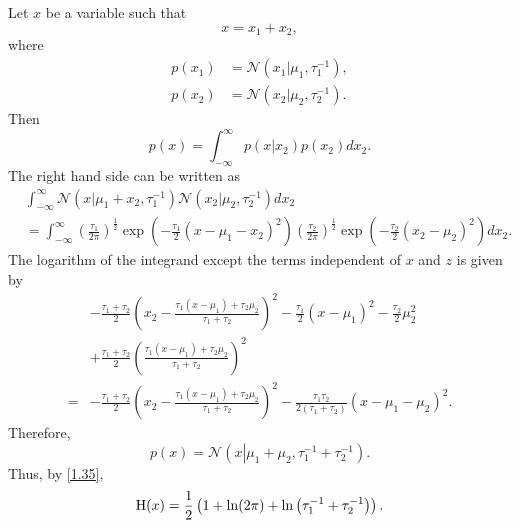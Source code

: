 \subsection{}
\label{2.16}
Let $x$ be a variable such that
\begin{equation}
x 
= 
x_1 
+ 
x_2,
\end{equation}
%
where
%
\begin{equation}
\begin{aligned}
p(x_1) 
&= 
\mathcal{N} 
\left(
	x_1 
	| 
	\mu_1, 
	\tau_1 ^ {- 1} 
\right), 
\\
p(x_2) 
&= 
\mathcal{N} 
\left(
	x_2
	| 
	\mu_2, 
	\tau_2 ^ {- 1} 
\right).
\end{aligned} 
\end{equation}
%
Then
%
\begin{equation}
p(x) 
= 
\int_{- \infty}^{\infty} 
p(x | x_2) 
p(x_2) 
dx_2.
\end{equation}
%
The right hand side can be written as
%
\begin{equation}
\begin{aligned}
&
\int_{- \infty}^{\infty} 
\mathcal{N} 
\left(
	x 
	| 
	\mu_1 
	+ 
	x_2, 
	\tau_1 ^ {-1}
\right) 
\mathcal{N} 
\left(
	x_2 
	| 
	\mu_2, 
	\tau_2 ^ {- 1} 
\right) 
dx_2 
\\
&= 
\int_{- \infty}^{\infty} 
\left( 
	\frac{\tau_1}{2 \pi} 
\right) ^ \frac{1}{2} 
\exp 
\left( 
	- 
	\frac{\tau_1}{2} 
	(x - \mu_1 - x_2) ^ 2 
\right) 
\left( 
	\frac{\tau_2}{2 \pi} 
\right) ^ \frac{1}{2} 
\exp 
\left( 
	- 
	\frac{\tau_2}{2} 
	(x_2 - \mu_2) ^ 2 
\right) 
dx_2.
\end{aligned}
\end{equation}
%
The logarithm of the integrand except the terms independent of $x$ and $z$ is given by
%
\begin{equation}
\begin{aligned}
& 
- 
\frac{\tau_1 + \tau_2}{2} 
\left( 
	x_2 
	- 
	\frac{\tau_1 (x - \mu_1) + \tau_2 \mu_2}{\tau_1 + \tau_2} 
\right) ^ 2
- 
\frac{\tau_1}{2} 
(x - \mu_1) ^ 2 
- 
\frac{\tau_2}{2} 
\mu_2 ^ 2 
\\
&+ 
\frac{\tau_1 + \tau_2}{2} 
\left( 
	\frac{\tau_1 (x - \mu_1) + \tau_2 \mu_2}{\tau_1 + \tau_2} 
\right) ^ 2
\\
=&
- 
\frac{\tau_1 + \tau_2}{2} 
\left( 
	x_2 
	- 
	\frac{\tau_1 (x - \mu_1) + \tau_2 \mu_2}{\tau_1 + \tau_2} 
\right) ^ 2
- 
\frac{\tau_1 \tau_2}{2 (\tau_1 + \tau_2)} 
( x - \mu_1 - \mu_2 ) ^ 2.
\end{aligned}
\end{equation}
%
Therefore,
%
\begin{equation}
p(x) 
= 
\mathcal{N} 
\left( 
	x 
	\left.
	\right \vert
	\mu_1 + \mu_2, 
	\tau_1 ^ {- 1} 
	+ 
	\tau_2 ^ {-1} 
\right).
\end{equation}
%
Thus, by \ref{1.35},
%
\begin{equation}
{\rm H}(x) 
= 
\frac{1}{2} 
\left( 
	1 
	+ 
	\ln (2 \pi)
	+ 
	\ln 
	\left( 
		\tau_1 ^ {- 1} 
		+ 
		\tau_2 ^ {-1} 
	\right) 
\right).
\end{equation}
%


